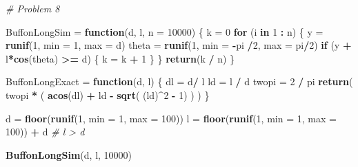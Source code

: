 \documentclass[
]{article}
\newenvironment{Shaded}{\begin{snugshade}}{\end{snugshade}}
\newcommand{\CommentTok}[1]{\textcolor[rgb]{0.56,0.35,0.01}{\textit{#1}}}
\newcommand{\ControlFlowTok}[1]{\textcolor[rgb]{0.13,0.29,0.53}{\textbf{#1}}}
\newcommand{\DataTypeTok}[1]{\textcolor[rgb]{0.13,0.29,0.53}{#1}}
\newcommand{\DecValTok}[1]{\textcolor[rgb]{0.00,0.00,0.81}{#1}}
\newcommand{\KeywordTok}[1]{\textcolor[rgb]{0.13,0.29,0.53}{\textbf{#1}}}
\newcommand{\NormalTok}[1]{#1}
\newcommand{\OperatorTok}[1]{\textcolor[rgb]{0.81,0.36,0.00}{\textbf{#1}}}
\newcommand{\StringTok}[1]{\textcolor[rgb]{0.31,0.60,0.02}{#1}}
\begin{document}
\begin{Shaded}
\begin{Highlighting}[]
\CommentTok{# Problem 8}

\NormalTok{BuffonLongSim =}\StringTok{ }\ControlFlowTok{function}\NormalTok{(d, l, }\DataTypeTok{n =} \DecValTok{10000}\NormalTok{) \{}
\NormalTok{  k =}\StringTok{ }\DecValTok{0}
  \ControlFlowTok{for}\NormalTok{ (i }\ControlFlowTok{in} \DecValTok{1} \OperatorTok{:}\StringTok{ }\NormalTok{n) \{}
\NormalTok{    y =}\StringTok{ }\KeywordTok{runif}\NormalTok{(}\DecValTok{1}\NormalTok{, }\DataTypeTok{min =} \DecValTok{1}\NormalTok{, }\DataTypeTok{max =}\NormalTok{ d)}
\NormalTok{    theta =}\StringTok{ }\KeywordTok{runif}\NormalTok{(}\DecValTok{1}\NormalTok{, }\DataTypeTok{min =} \OperatorTok{-}\NormalTok{pi }\OperatorTok{/}\DecValTok{2}\NormalTok{, }\DataTypeTok{max =}\NormalTok{ pi}\OperatorTok{/}\DecValTok{2}\NormalTok{)}
    \ControlFlowTok{if}\NormalTok{ (y }\OperatorTok{+}\StringTok{ }\NormalTok{l}\OperatorTok{*}\KeywordTok{cos}\NormalTok{(theta) }\OperatorTok{>=}\StringTok{ }\NormalTok{d) \{}
\NormalTok{      k =}\StringTok{ }\NormalTok{k }\OperatorTok{+}\StringTok{ }\DecValTok{1}
\NormalTok{    \}}
\NormalTok{  \}}
  \KeywordTok{return}\NormalTok{(k }\OperatorTok{/}\StringTok{ }\NormalTok{n)}
\NormalTok{\}}

\NormalTok{BuffonLongExact =}\StringTok{ }\ControlFlowTok{function}\NormalTok{(d, l) \{}
\NormalTok{  dl =}\StringTok{ }\NormalTok{d}\OperatorTok{/}\StringTok{ }\NormalTok{l}
\NormalTok{  ld =}\StringTok{ }\NormalTok{l }\OperatorTok{/}\StringTok{ }\NormalTok{d}
\NormalTok{  twopi =}\StringTok{ }\DecValTok{2} \OperatorTok{/}\StringTok{ }\NormalTok{pi}
  \KeywordTok{return}\NormalTok{( twopi }\OperatorTok{*}\StringTok{ }\NormalTok{( }\KeywordTok{acos}\NormalTok{(dl) }\OperatorTok{+}\StringTok{ }\NormalTok{ld }\OperatorTok{-}\StringTok{ }\KeywordTok{sqrt}\NormalTok{( (ld)}\OperatorTok{^}\DecValTok{2} \OperatorTok{-}\StringTok{ }\DecValTok{1}\NormalTok{) ) )}
\NormalTok{\}}


\NormalTok{d =}\StringTok{ }\KeywordTok{floor}\NormalTok{(}\KeywordTok{runif}\NormalTok{(}\DecValTok{1}\NormalTok{, }\DataTypeTok{min =} \DecValTok{1}\NormalTok{, }\DataTypeTok{max =} \DecValTok{100}\NormalTok{))}
\NormalTok{l =}\StringTok{ }\KeywordTok{floor}\NormalTok{(}\KeywordTok{runif}\NormalTok{(}\DecValTok{1}\NormalTok{, }\DataTypeTok{min =} \DecValTok{1}\NormalTok{, }\DataTypeTok{max =} \DecValTok{100}\NormalTok{)) }\OperatorTok{+}\StringTok{ }\NormalTok{d   }\CommentTok{# l > d}

\KeywordTok{BuffonLongSim}\NormalTok{(d, l, }\DecValTok{10000}\NormalTok{)}
\end{Highlighting}
\end{Shaded}
\end{document}
